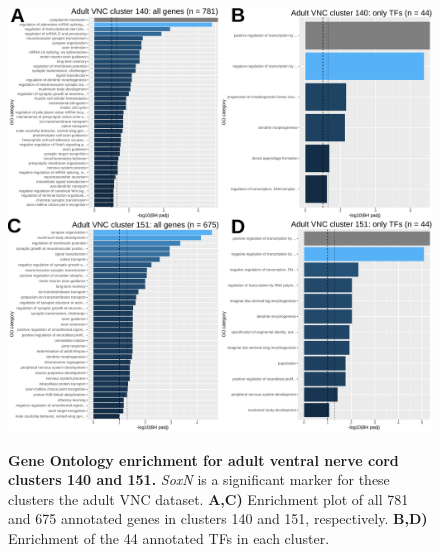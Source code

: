 \documentclass[withindex,glossary]{cam-thesis}
\begin{document}
\setcounter{figure}{26-1}
\begin{figure}[!htb]
\centering
\includegraphics[width=\dimexpr\textwidth\relax,keepaspectratio]{figs/Fig 26 allen clusters 140 and 151.pdf}
\label{fig26}
\caption{\textbf{Gene Ontology enrichment for adult ventral nerve cord clusters 140 and 151.} \emph{SoxN} is a significant marker for these clusters the adult VNC dataset. \textbf{A,C)} Enrichment plot of all 781 and 675 annotated genes in clusters 140 and 151, respectively. \textbf{B,D)} Enrichment of the 44 annotated TFs in each cluster.}
\end{figure}
\end{document}

